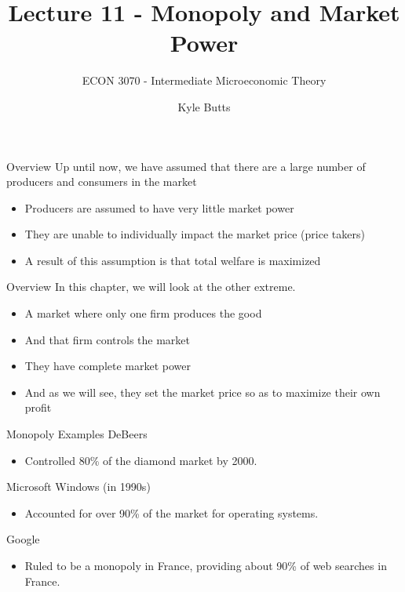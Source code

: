 \documentclass[11pt,t]{beamer}
\author{Kyle Butts}
\title{Lecture 11 - Monopoly and Market Power}
\subtitle{ECON 3070 - Intermediate Microeconomic Theory}
\begin{document}
\begin{frame}
  \titlepage
\end{frame}

\begin{frame}{Overview}
  Up until now, we have assumed that there are a large number of producers and consumers in the market

  \begin{itemize}
    \item Producers are assumed to have very little market power
    
    \item They are unable to individually impact the market price (price takers)
     
    \item A result of this assumption is that total welfare is maximized
  \end{itemize}
\end{frame}

\begin{frame}{Overview}
  In this chapter, we will look at the other extreme.

  \begin{itemize}
    \item A market where only one firm produces the good
    \item And that firm controls the market
    \item They have complete market power
    \item And as we will see, they set the market price so as to maximize their own profit
  \end{itemize}
\end{frame}

\begin{frame}{Monopoly Examples}
  DeBeers 
  \begin{itemize}
    \item Controlled 80\% of the diamond market by 2000.
  \end{itemize}

  \bigskip
  Microsoft Windows (in 1990s)
  \begin{itemize}
    \item Accounted for over 90\% of the market for operating systems.
  \end{itemize}

  \bigskip
  Google
  \begin{itemize}
    \item Ruled to be a monopoly in France, providing about 90\% of web searches in France.
  \end{itemize}
\end{frame}
\end{document}

